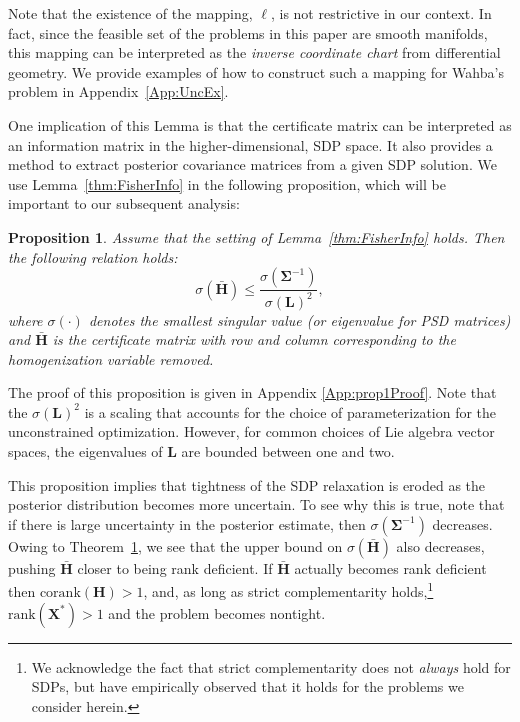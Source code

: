 \documentclass[lettersize,journal]{IEEEtran}
\newtheorem{proposition}[theorem]{Proposition}
\begin{document}
Note that the existence of the mapping, $\bm{\ell}$, is not restrictive in our context. In fact, since the feasible set of the problems in this paper are smooth manifolds, this mapping can be interpreted as the \emph{inverse coordinate chart} from differential geometry.  We provide examples of how to construct such a mapping for Wahba's problem in Appendix~\ref{App:UncEx}.

One implication of this Lemma is that the certificate matrix can be interpreted as an information matrix in the higher-dimensional, SDP space.
It also provides a method to extract posterior covariance matrices from a given SDP solution. We use Lemma~\ref{thm:FisherInfo} in the following proposition, which will be important to our subsequent analysis:
\begin{proposition}\label{thm:eig_bounds}
	Assume that the setting of Lemma~\ref{thm:FisherInfo} holds. Then the following relation holds:
	\begin{equation}
		\sigma(\bar{\bm{H}})  \leq \frac{\sigma(\bm{\Sigma}^{-1})}{\sigma(\bm{L})^2}, 
	\end{equation}
	where $\sigma(\cdot)$ denotes the smallest singular value (or eigenvalue for PSD matrices) and $\bar{\bm{H}}$ is the certificate matrix with row and column corresponding to the homogenization variable removed.
\end{proposition}

The proof of this proposition is given in Appendix \ref{App:prop1Proof}.
Note that the $\sigma(\bm{L})^2$ is a scaling that accounts for the choice of parameterization for the unconstrained optimization. However, for common choices of Lie algebra vector spaces, the eigenvalues of $\bm{L}$ are bounded between one and two.

This proposition implies that tightness of the SDP relaxation is eroded as the posterior distribution becomes more uncertain. To see why this is true, 
note that if there is large uncertainty in the posterior estimate, then $\sigma(\bm{\Sigma}^{-1})$ decreases. Owing to Theorem~\ref{thm:eig_bounds}, we see that the upper bound on $\sigma(\bar{\bm{H}})$ also decreases, pushing $\bar{\bm{H}}$ closer to being rank deficient. If $\bar{\bm{H}}$ actually becomes rank deficient then $\mbox{corank}(\bm{H})>1$, and, as long as strict complementarity holds,\footnote{We acknowledge the fact that strict complementarity does not \emph{always} hold for SDPs, but have empirically observed that it holds for the problems we consider herein.} $\mbox{rank}(\bm{X}^*)>1$ and the problem becomes nontight.
\end{document}
